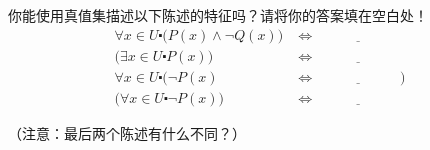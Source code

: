 你能使用真值集描述以下陈述的特征吗？请将你的答案填在空白处！
\begin{align*}
    \forall x \in U \centerdot \big(P(x) \land \neg Q(x)\big) & \iff \underline{\qquad\qquad\qquad} \\
    \big(\exists x \in U \centerdot P(x)\big) & \iff \underline{\qquad\qquad\qquad} \\
    \forall x \in U \centerdot \big(\neg P(x) & \iff \underline{\qquad\qquad\qquad}\big) \\
    \big(\forall x \in U \centerdot \neg P(x)\big) & \iff \underline{\qquad\qquad\qquad}
\end{align*}

（注意：最后两个陈述有什么不同？）
